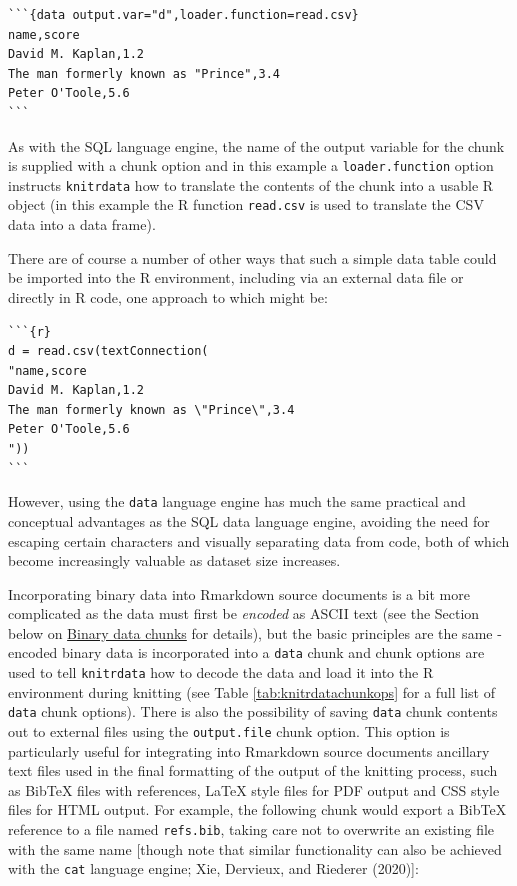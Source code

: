 \begin{verbatim}
```{data output.var="d",loader.function=read.csv}
name,score
David M. Kaplan,1.2
The man formerly known as "Prince",3.4
Peter O'Toole,5.6
```
\end{verbatim}

As with the SQL language engine, the name of the output variable for the chunk is supplied with a chunk option and in this example a \texttt{loader.function} option instructs \texttt{knitrdata} how to translate the contents of the chunk into a usable R object (in this example the R function \texttt{read.csv} is used to translate the CSV data into a data frame).

There are of course a number of other ways that such a simple data table could be imported into the R environment, including via an external data file or directly in R code, one approach to which might be:

\begin{verbatim}
```{r}
d = read.csv(textConnection(
"name,score
David M. Kaplan,1.2
The man formerly known as \"Prince\",3.4
Peter O'Toole,5.6
"))
```
\end{verbatim}

However, using the \texttt{data} language engine has much the same practical and conceptual advantages as the SQL data language engine, avoiding the need for escaping certain characters and visually separating data from code, both of which become increasingly valuable as dataset size increases.

Incorporating binary data into Rmarkdown source documents is a bit more complicated as the data must first be \emph{encoded} as ASCII text (see the Section below on \protect\hyperlink{binary}{Binary data chunks} for details), but the basic principles are the same - encoded binary data is incorporated into a \texttt{data} chunk and chunk options are used to tell \texttt{knitrdata} how to decode the data and load it into the R environment during knitting (see Table \ref{tab:knitrdatachunkops} for a full list of \texttt{data} chunk options). There is also the possibility of saving \texttt{data} chunk contents out to external files using the \texttt{output.file} chunk option. This option is particularly useful for integrating into Rmarkdown source documents ancillary text files used in the final formatting of the output of the knitting process, such as BibTeX files with references, LaTeX style files for PDF output and CSS style files for HTML output. For example, the following chunk would export a BibTeX reference to a file named \texttt{refs.bib}, taking care not to overwrite an existing file with the same name {[}though note that similar functionality can also be achieved with the \texttt{cat} language engine; Xie, Dervieux, and Riederer (2020){]}:


